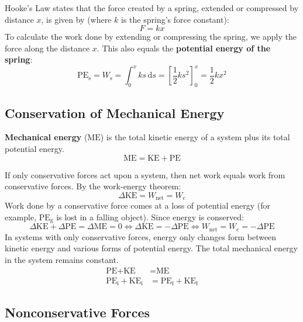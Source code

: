 \documentclass{article}
\newcommand{\definition}[1]{\begin{tcolorbox}[colback=red!5!white,colframe=red!75!black,parbox=false] #1 \end{tcolorbox}}
\begin{document}
Hooke's Law states that the force created by a spring, extended or compressed by distance $x$, is given by (where $k$ is the spring's force constant):
\begin{equation*}
    F=kx
\end{equation*}
To calculate the work done by extending or compressing the spring, we apply the force along the distance $x$. This also equals the \textbf{potential energy of the spring}:
\begin{equation*}
	\text{PE}_{\text{s}}
	=W_\text{s}
	=\int_{0}^{x}ks\,\mathrm{d}s
	=\left[\frac12 ks^2\right]_{0}^{x}
	=\frac12 kx^2
\end{equation*}

\subsection{Conservation of Mechanical Energy}

\definition{\textbf{Mechanical energy} ($\text{ME}$) is the total kinetic energy of a system plus its total potential energy.
\begin{equation*}
	\text{ME}=\text{KE}+\text{PE}
\end{equation*}}
If only conservative forces act upon a system, then net work equals work from conservative forces. By the work-energy theorem:
\begin{equation*}
	\Delta \text{KE}=W_{\text{net}}=W_{\text{c}}
\end{equation*}
Work done by a conservative force comes at a loss of potential energy (for example, $\text{PE}_\text{g}$ is lost in a falling object). Since energy is conserved:
\begin{equation*}
	\Delta \text{KE}+\Delta \text{PE}=\Delta \text{ME}=0
	\iff \Delta \text{KE}=-\Delta \text{PE}
	\iff W_\text{net}=W_\text{c}=-\Delta \text{PE}
\end{equation*}
In systems with only conservative forces, energy only changes form between kinetic energy and various forms of potential energy. The total mechanical energy in the system remains constant.
\begin{align*}
	\text{PE}+\text{KE}&=\text{ME} \\
	\text{PE}_\text{i}+\text{KE}_\text{i}&=\text{PE}_\text{f}+\text{KE}_\text{f}
\end{align*}

\subsection{Nonconservative Forces}
\end{document}
